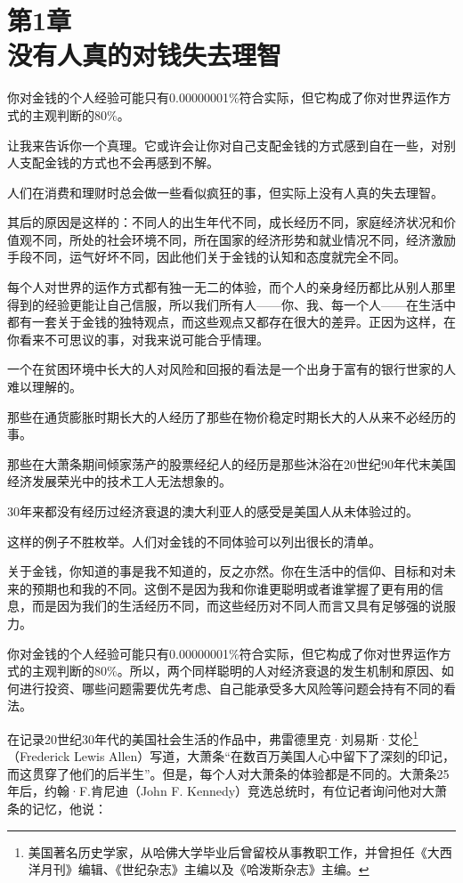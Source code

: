 
\section[第1章\q 没有人真的对钱失去理智]{第1章\\ 没有人真的对钱失去理智}

{\kaishu

你对金钱的个人经验可能只有0.00000001\%符合实际，但它构成了你对世界运作方式的主观判断的80\%。

}

让我来告诉你一个真理。它或许会让你对自己支配金钱的方式感到自在一些，对别人支配金钱的方式也不会再感到不解。

人们在消费和理财时总会做一些看似疯狂的事，但实际上没有人真的失去理智。

其后的原因是这样的：不同人的出生年代不同，成长经历不同，家庭经济状况和价值观不同，所处的社会环境不同，所在国家的经济形势和就业情况不同，经济激励手段不同，运气好坏不同，因此他们关于金钱的认知和态度就完全不同。

每个人对世界的运作方式都有独一无二的体验，而个人的亲身经历都比从别人那里得到的经验更能让自己信服，所以我们所有人——你、我、每一个人——在生活中都有一套关于金钱的独特观点，而这些观点又都存在很大的差异。正因为这样，在你看来不可思议的事，对我来说可能合乎情理。

一个在贫困环境中长大的人对风险和回报的看法是一个出身于富有的银行世家的人难以理解的。

那些在通货膨胀时期长大的人经历了那些在物价稳定时期长大的人从来不必经历的事。

那些在大萧条期间倾家荡产的股票经纪人的经历是那些沐浴在20世纪90年代末美国经济发展荣光中的技术工人无法想象的。

30年来都没有经历过经济衰退的澳大利亚人的感受是美国人从未体验过的。

这样的例子不胜枚举。人们对金钱的不同体验可以列出很长的清单。

关于金钱，你知道的事是我不知道的，反之亦然。你在生活中的信仰、目标和对未来的预期也和我的不同。这倒不是因为我和你谁更聪明或者谁掌握了更有用的信息，而是因为我们的生活经历不同，而这些经历对不同人而言又具有足够强的说服力。

你对金钱的个人经验可能只有0.00000001\%符合实际，但它构成了你对世界运作方式的主观判断的80\%。所以，两个同样聪明的人对经济衰退的发生机制和原因、如何进行投资、哪些问题需要优先考虑、自己能承受多大风险等问题会持有不同的看法。

在记录20世纪30年代的美国社会生活的作品中，弗雷德里克·刘易斯·艾伦\footnote{美国著名历史学家，从哈佛大学毕业后曾留校从事教职工作，并曾担任《大西洋月刊》编辑、《世纪杂志》主编以及《哈泼斯杂志》主编。}（Frederick Lewis Allen）写道，大萧条“在数百万美国人心中留下了深刻的印记，而这贯穿了他们的后半生”。但是，每个人对大萧条的体验都是不同的。大萧条25年后，约翰·F.肯尼迪（John F. Kennedy）竞选总统时，有位记者询问他对大萧条的记忆，他说：


